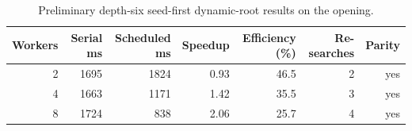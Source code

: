 \begin{table}[t]
\centering
\caption{Preliminary depth-six seed-first dynamic-root results on the opening.}
\label{tab:phase-seven-root}
\scriptsize
\begin{tabular}{rrrrrrr}
\toprule
Workers & Serial ms & Scheduled ms & Speedup & Efficiency (\%) & Re-searches & Parity \\
\midrule
2 & 1695 & 1824 & 0.93 & 46.5 & 2 & yes \\
4 & 1663 & 1171 & 1.42 & 35.5 & 3 & yes \\
8 & 1724 & 838 & 2.06 & 25.7 & 4 & yes \\
\bottomrule
\end{tabular}
\end{table}
